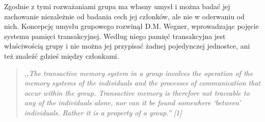 Zgodnie z tymi rozważaniami grupa ma własny umysł i można badać jej zachowanie
niezależnie od badania cech jej członków, ale nie w oderwaniu od nich. Koncepcję
umysłu grupowego rozwinął D.M. Wegner, wprowadzając pojęcie systemu pamięci
transakcyjnej. Według niego pamięć transakcyjna jest właściwością grupy i nie
można jej przypisać żadnej pojedynczej jednostce, ani też znaleźć gdzieś między
członkami.

\begin{quote}\em
,,The transactive memory system in a group involves the operation of the 
memory systems of the individuals and the processes of communication that occur 
within the group. Transactive memory is therefore not traceable to any of the 
individuals alone, nor can it be found somewhere `between' individuals. Rather 
it is a property of a group.'' [1]
\end{quote}

